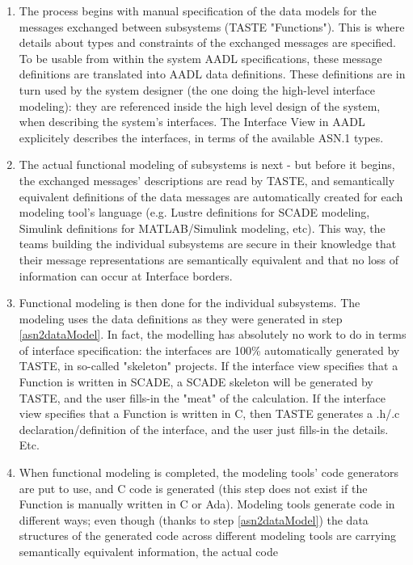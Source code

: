 \documentclass[11pt]{book}
\begin{document}
\begin{enumerate}
\item The process begins with manual specification of the data models for the messages exchanged between
subsystems (TASTE "Functions"). This is where details about types and constraints of the exchanged messages
are specified. To be usable from within the system AADL specifications, 
these message definitions are translated into AADL data definitions. 
These definitions are in turn used by the system designer (the one doing the high-level
interface modeling): they are referenced inside the high level design of the system, when describing
the system's interfaces. The Interface View in AADL explicitely describes the interfaces,
in terms of the available ASN.1 types.
\item \label{asn2dataModel} The actual functional modeling of subsystems is next - but before it begins,
the exchanged messages' descriptions are read by TASTE, and semantically
equivalent definitions of the data messages are automatically created for each modeling tool's language
(e.g. Lustre definitions for SCADE modeling, Simulink definitions for MATLAB/Simulink modeling, etc).
This way, the teams building the individual subsystems are secure in their knowledge that their message representations
are semantically equivalent and that no loss of information can occur at Interface borders.
\item Functional modeling is then done for the individual subsystems. The modeling uses the
data definitions as they were generated in step \ref{asn2dataModel}. In fact, the modelling 
has absolutely no work to do in terms of interface specification: the interfaces are 100\%
automatically generated by TASTE, in so-called "skeleton" projects. If the interface view
specifies that a Function is written in SCADE, a SCADE skeleton will be generated by TASTE,
and the user fills-in the "meat" of the calculation. If the interface view specifies that a
Function is written in C, then TASTE generates a .h/.c declaration/definition of the interface,
and the user just fills-in the details. Etc.
\item When functional modeling is completed, the modeling tools' code generators are put to use,
and C code is generated (this step does not exist if the Function is manually written in C or Ada). 
Modeling tools generate code in different ways; even though (thanks to
step \ref{asn2dataModel}) the data structures of the generated code across different modeling tools
are carrying semantically equivalent information, the actual code

\end{enumerate}
\end{document}

